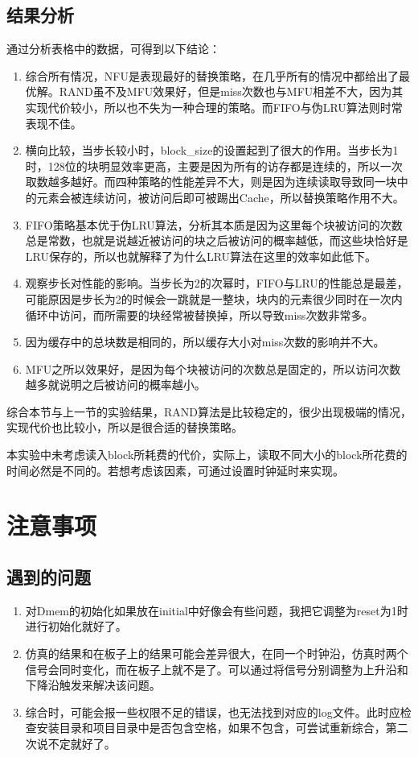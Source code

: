 \documentclass[12pt]{article} %
\begin{document}
\begin{sloppypar}
\subsection{结果分析}

通过分析表格中的数据，可得到以下结论：
\begin{enumerate}
\item 综合所有情况，NFU是表现最好的替换策略，在几乎所有的情况中都给出了最优解。RAND虽不及MFU效果好，但是miss次数也与MFU相差不大，因为其实现代价较小，所以也不失为一种合理的策略。而FIFO与伪LRU算法则时常表现不佳。
\item 横向比较，当步长较小时，block\_size的设置起到了很大的作用。当步长为1时，128位的块明显效率更高，主要是因为所有的访存都是连续的，所以一次取数越多越好。而四种策略的性能差异不大，则是因为连续读取导致同一块中的元素会被连续访问，被访问后即可被踢出Cache，所以替换策略作用不大。
\item FIFO策略基本优于伪LRU算法，分析其本质是因为这里每个块被访问的次数总是常数，也就是说越近被访问的块之后被访问的概率越低，而这些块恰好是LRU保存的，所以也就解释了为什么LRU算法在这里的效率如此低下。
\item 观察步长对性能的影响。当步长为2的次幂时，FIFO与LRU的性能总是最差，可能原因是步长为2的时候会一跳就是一整块，块内的元素很少同时在一次内循环中访问，而所需要的块经常被替换掉，所以导致miss次数非常多。
\item 因为缓存中的总块数是相同的，所以缓存大小对miss次数的影响并不大。
\item MFU之所以效果好，是因为每个块被访问的次数总是固定的，所以访问次数越多就说明之后被访问的概率越小。
\end{enumerate}

综合本节与上一节的实验结果，RAND算法是比较稳定的，很少出现极端的情况，实现代价也比较小，所以是很合适的替换策略。

本实验中未考虑读入block所耗费的代价，实际上，读取不同大小的block所花费的时间必然是不同的。若想考虑该因素，可通过设置时钟延时来实现。


\newpage
\section{注意事项}

\subsection{遇到的问题}

\begin{enumerate}
\item 对Dmem的初始化如果放在initial中好像会有些问题，我把它调整为reset为1时进行初始化就好了。
\item 仿真的结果和在板子上的结果可能会差异很大，在同一个时钟沿，仿真时两个信号会同时变化，而在板子上就不是了。可以通过将信号分别调整为上升沿和下降沿触发来解决该问题。
\item 综合时，可能会报一些权限不足的错误，也无法找到对应的log文件。此时应检查安装目录和项目目录中是否包含空格，如果不包含，可尝试重新综合，第二次说不定就好了。
\end{enumerate}


\end{sloppypar}
\end{document}
